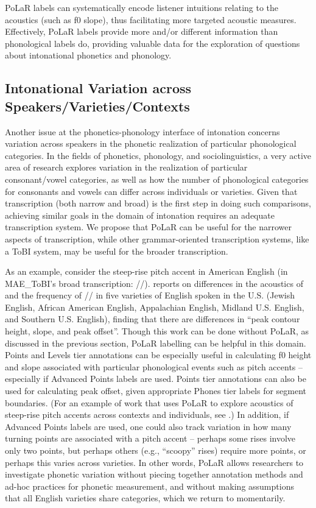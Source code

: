 \documentclass[11pt, twoside]{memoir}
\def\polar#1{{\relsize{-.5}\fontspec[Mapping=tex-text]{Roboto Mono}{#1}}}
\def\tobi#1{\polar{#1}}
\begin{document}
PoLaR labels can systematically encode listener intuitions relating to the acoustics (such as f0 slope), thus facilitating more targeted acoustic measures. Effectively, PoLaR labels provide more and/or different information than phonological labels do, providing valuable data for the exploration of questions about intonational phonetics and phonology.

\subsection{Intonational Variation across Speakers\slash Varieties\slash Contexts}\label{sec:interspeaker-variation-in-realization-of-prosodic-categories}

Another issue at the phonetics-phonology interface of intonation concerns variation across speakers in the phonetic realization of particular phonological categories. In the fields of phonetics, phonology, and sociolinguistics, a very active area of research explores variation in the realization of particular consonant\slash vowel categories, as well as how the number of phonological categories for consonants and vowels can differ across individuals or varieties. Given that transcription (both narrow and broad) is the first step in doing such comparisons, achieving similar goals in the domain of intonation requires an adequate transcription system. We propose that PoLaR can be useful for the narrower aspects of transcription, while other grammar-oriented transcription systems, like a ToBI system, may be useful for the broader transcription.

As an example, consider the steep-rise pitch accent in American English (in MAE\_ToBI’s broad transcription: /\tobi{L+H*}/). \citealt{burdin-18} reports on differences in the acoustics of and the frequency of /\tobi{L+H*}/ in five varieties of English spoken in the U.S. (Jewish English, African American English, Appalachian English, Midland U.S. English, and Southern U.S. English), finding that there are differences in “peak contour height, slope, and peak offset”. Though this work can be done without PoLaR, as discussed in the previous section, PoLaR labelling can be helpful in this domain. Points and Levels tier annotations can be especially useful in calculating f0 height and slope associated with particular phonological events such as pitch accents – especially if Advanced Points labels are used. Points tier annotations can also be used for calculating peak offset, given appropriate Phones tier labels for segment boundaries. (For an example of work that uses PoLaR to explore acoustics of steep-rise pitch accents across contexts and individuals, see \citealt{holliday21a}.)  In addition, if Advanced Points labels are used, one could also track variation in how many turning points are associated with a pitch accent – perhaps some rises involve only two points, but perhaps others (e.g., “scoopy” rises) require more points, or perhaps this varies across varieties. In other words, PoLaR allows researchers to investigate phonetic variation without piecing together annotation methods and ad-hoc practices for phonetic measurement, and without making assumptions that all English varieties share categories, which we return to momentarily.
\end{document}
